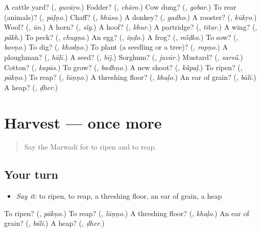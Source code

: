 \begin{tcolorbox}[breakable,colback=teal!4,colframe=teal!35!black,title={Before you move on}]
A cattle yard? (\textbf{}, \emph{guvāṛo}.) Fodder? (\textbf{}, \emph{chāro}.) Cow dung? (\textbf{}, \emph{gobar}.) To rear (animals)? (\textbf{}, \emph{pāḷṇo}.) Chaff? (\textbf{}, \emph{bhūso}.) A donkey? (\textbf{}, \emph{gadho}.) A rooster? (\textbf{}, \emph{kūkṛo}.) Wool? (\textbf{}, \emph{ūn}.) A horn? (\textbf{}, \emph{sī̃g}.) A hoof? (\textbf{}, \emph{khur}.) A partridge? (\textbf{}, \emph{tītar}.) A wing? (\textbf{}, \emph{pā̃kh}.) To peck? (\textbf{}, \emph{chugṇo}.) An egg? (\textbf{}, \emph{iṇḍo}.) A frog? (\textbf{}, \emph{mī̃ḍko}.) To sow? (\textbf{}, \emph{bovṇo}.) To dig? (\textbf{}, \emph{khodṇo}.) To plant (a seedling or a tree)? (\textbf{}, \emph{ropṇo}.) A ploughman? (\textbf{}, \emph{hāḷī}.) A seed? (\textbf{}, \emph{bīj}.) Sorghum? (\textbf{}, \emph{juvār}.) Mustard? (\textbf{}, \emph{sarsū̃}.) Cotton? (\textbf{}, \emph{kapās}.) To grow? (\textbf{}, \emph{badhṇo}.) A new shoot? (\textbf{}, \emph{kū̃paḷ}.) To ripen? (\textbf{}, \emph{pākṇo}.) To reap? (\textbf{}, \emph{lūṇṇo}.) A threshing floor? (\textbf{}, \emph{khaḷo}.) An ear of grain? (\textbf{}, \emph{bālī}.) A heap? (\textbf{}, \emph{ḍher}.)
\end{tcolorbox}
\section[(dialogue)]{Harvest — once more}

\label{lesson:MW-R240-review-final-240}



\begin{quote}
Say the Marwadi for to ripen and to reap.
\end{quote}

\subsection*{Your turn}
\begin{itemize}
\raggedright
  \item \emph{Say it:} to ripen, to reap, a threshing floor, an ear of grain, a heap
\end{itemize}

\begin{tcolorbox}[breakable,colback=teal!4,colframe=teal!35!black,title={Before you move on}]
To ripen? (\textbf{}, \emph{pākṇo}.) To reap? (\textbf{}, \emph{lūṇṇo}.) A threshing floor? (\textbf{}, \emph{khaḷo}.) An ear of grain? (\textbf{}, \emph{bālī}.) A heap? (\textbf{}, \emph{ḍher}.)
\end{tcolorbox}
